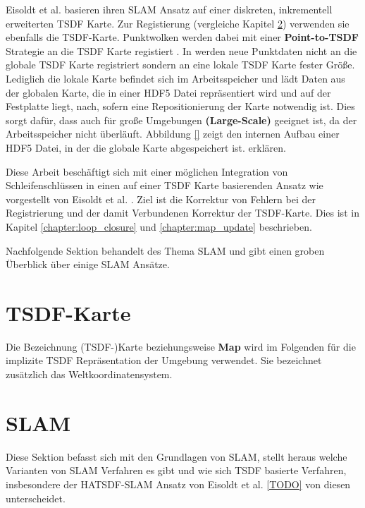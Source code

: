 Eisoldt et al. \cite{HATSDF} basieren ihren SLAM Ansatz auf einer diskreten, inkrementell erweiterten TSDF Karte. Zur Registierung (vergleiche Kapitel \ref{section:slam}) verwenden sie ebenfalls die TSDF-Karte. Punktwolken werden dabei mit einer \textbf{Point-to-TSDF} Strategie an die TSDF Karte registiert \cite{HATSDF}.
In \cite{HATSDF} werden neue Punktdaten nicht an die globale TSDF Karte registriert sondern an eine lokale TSDF Karte fester Größe. Lediglich die lokale Karte befindet sich im Arbeitsspeicher und lädt Daten aus der globalen Karte, die in einer HDF5 Datei repräsentiert wird und auf der Festplatte liegt, nach, sofern eine Repositionierung der Karte notwendig ist.
Dies sorgt dafür, dass \cite{HATSDF} auch für große Umgebungen \textbf{(Large-Scale)} geeignet ist, da der Arbeitsspeicher nicht überläuft.
Abbildung \ref{} zeigt den internen Aufbau einer HDF5 Datei, in der die globale Karte abgespeichert ist.
 erklären.

Diese Arbeit beschäftigt sich mit einer möglichen Integration von Schleifenschlüssen in einen auf einer TSDF Karte basierenden Ansatz wie vorgestellt von Eisoldt et al. \cite{HATSDF}. Ziel ist die Korrektur von Fehlern bei der Registrierung und der damit Verbundenen Korrektur der TSDF-Karte. Dies ist in Kapitel \ref{chapter:loop_closure} und \ref{chapter:map_update} beschrieben.

Nachfolgende Sektion behandelt des Thema SLAM und gibt einen groben Überblick über einige SLAM Ansätze. 

\section{TSDF-Karte}
\label{section:tsdf_map}

Die Bezeichnung (TSDF-)Karte beziehungsweise \textbf{Map} wird im Folgenden für die implizite TSDF Repräsentation der Umgebung verwendet.
Sie bezeichnet zusätzlich das Weltkoordinatensystem.



\section{SLAM}
\label{section:slam}

Diese Sektion befasst sich mit den Grundlagen von SLAM, stellt heraus welche Varianten von SLAM Verfahren es gibt und wie sich TSDF basierte Verfahren, insbesondere der HATSDF-SLAM Ansatz von Eisoldt et al. \ref{TODO} von diesen unterscheidet.

